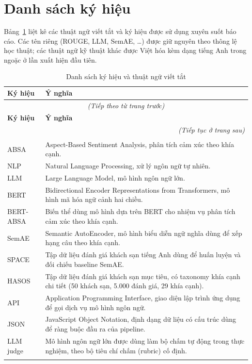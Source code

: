 \documentclass[12pt,a4paper]{report}
\begin{document}
\clearpage

\chapter*{Danh sách ký hiệu}

Bảng~\ref{tab:symbols} liệt kê các thuật ngữ viết tắt và ký hiệu được sử dụng xuyên suốt báo cáo. Các tên riêng (ROUGE, LLM, SemAE, \dots) được giữ nguyên theo thông lệ học thuật; các thuật ngữ kỹ thuật khác được Việt hóa kèm dạng tiếng Anh trong ngoặc ở lần xuất hiện đầu tiên.

\renewcommand{\arraystretch}{1.25}
\begin{longtable}{p{} p{}}
\caption{Danh sách ký hiệu và thuật ngữ viết tắt}\label{tab:symbols}\\
\toprule
\textbf{Ký hiệu} & \textbf{Ý nghĩa} \\
\midrule
\endfirsthead
\multicolumn{2}{c}{\textit{(Tiếp theo từ trang trước)}} \\
\toprule
\textbf{Ký hiệu} & \textbf{Ý nghĩa} \\
\midrule
\endhead
\midrule
\multicolumn{2}{r}{\textit{(Tiếp tục ở trang sau)}} \\
\endfoot
\bottomrule
\endlastfoot

\multicolumn{2}{l}{\textit{\textbf{Tên riêng và viết tắt}}} \\
\addlinespace[2pt]
ABSA & Aspect-Based Sentiment Analysis, phân tích cảm xúc theo khía cạnh. \\
NLP & Natural Language Processing, xử lý ngôn ngữ tự nhiên. \\
LLM & Large Language Model, mô hình ngôn ngữ lớn. \\
BERT & Bidirectional Encoder Representations from Transformers, mô hình mã hóa ngữ cảnh hai chiều. \\
BERT-ABSA & Biến thể dùng mô hình dựa trên BERT cho nhiệm vụ phân tích cảm xúc theo khía cạnh. \\
SemAE & Semantic AutoEncoder, mô hình biểu diễn ngữ nghĩa dùng để xếp hạng câu theo khía cạnh. \\
SPACE & Tập dữ liệu đánh giá khách sạn tiếng Anh dùng để huấn luyện và đối chiếu baseline SemAE. \\
HASOS & Tập dữ liệu đánh giá khách sạn mục tiêu, có taxonomy khía cạnh chi tiết (50 khách sạn, 5.000 đánh giá, 29 khía cạnh). \\
API & Application Programming Interface, giao diện lập trình ứng dụng để gọi dịch vụ mô hình ngôn ngữ. \\
JSON & JavaScript Object Notation, định dạng dữ liệu có cấu trúc dùng để ràng buộc đầu ra của pipeline. \\
LLM judge & Mô hình ngôn ngữ lớn được dùng làm bộ chấm tự động trong thực nghiệm, theo bộ tiêu chí chấm (rubric) cố định. \\
\addlinespace[3pt]


\end{longtable}
\end{document}
